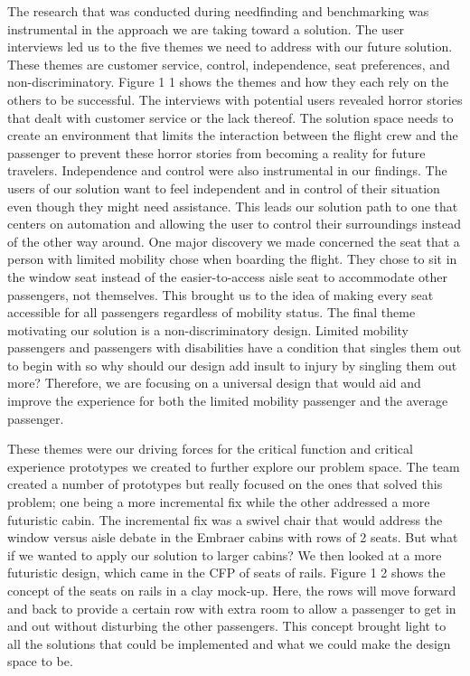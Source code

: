 \documentclass[a4paper, 12pt,conference]{new_cit_thesis}
\begin{document}
The research that was conducted during needfinding and benchmarking was instrumental in the approach we are taking toward a solution.  The user interviews led us to the five themes we need to address with our future solution.  These themes are customer service, control, independence, seat preferences, and non-discriminatory. Figure 1 1 shows the themes and how they each rely on the others to be successful.  The interviews with potential users revealed horror stories that dealt with customer service or the lack thereof.  The solution space needs to create an environment that limits the interaction between the flight crew and the passenger to prevent these horror stories from becoming a reality for future travelers.   Independence and control were also instrumental in our findings.  The users of our solution want to feel independent and in control of their situation even though they might need assistance.  This leads our solution path to one that centers on automation and allowing the user to control their surroundings instead of the other way around.  One major discovery we made concerned the seat that a person with limited mobility chose when boarding the flight.  They chose to sit in the window seat instead of the easier-to-access aisle seat to accommodate other passengers, not themselves.  This brought us to the idea of making every seat accessible for all passengers regardless of mobility status.  The final theme motivating our solution is a non-discriminatory design.  Limited mobility passengers and passengers with disabilities have a condition that singles them out to begin with so why should our design add insult to injury by singling them out more?  Therefore, we are focusing on a universal design that would aid and improve the experience for both the limited mobility passenger and the average passenger.

These themes were our driving forces for the critical function and critical experience prototypes we created to further explore our problem space.  The team created a number of prototypes but really focused on the ones that solved this problem; one being a more incremental fix while the other addressed a more futuristic cabin.  The incremental fix was a swivel chair that would address the window versus aisle debate in the Embraer cabins with rows of 2 seats.  But what if we wanted to apply our solution to larger cabins? We then looked at a more futuristic design, which came in the CFP of seats of rails. Figure 1 2 shows the concept of the seats on rails in a clay mock-up. Here, the rows will move forward and back to provide a certain row with extra room to allow a passenger to get in and out without disturbing the other passengers.  This concept brought light to all the solutions that could be implemented and what we could make the design space to be.
\end{document}
